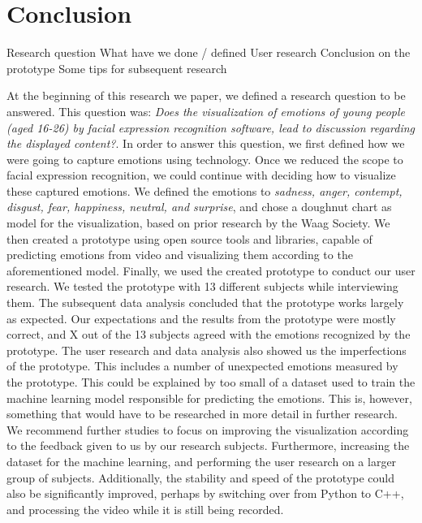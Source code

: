 \documentclass[sigconf]{acmart}
\begin{document}

\section{Conclusion}
Research question
What have we done / defined
User research
Conclusion on the prototype
Some tips for subsequent research

At the beginning of this research we paper, we defined a research question to be answered. This question was:
\emph{Does the visualization of emotions of young people (aged 16-26) by facial expression recognition software,
lead to discussion regarding the displayed content?}. In order to answer this question, we first defined how
we were going to capture emotions using technology. Once we reduced the scope to facial expression recognition,
we could continue with deciding how to visualize these captured emotions. We defined the emotions to
\emph{sadness, anger, contempt, disgust, fear, happiness, neutral, and surprise}, and chose a doughnut chart
as model for the visualization, based on prior research by the Waag Society. We then created a prototype
using open source tools and libraries, capable of predicting emotions from video and visualizing them according
to the aforementioned model.
Finally, we used the created prototype to conduct our user research. We tested the prototype with 13 different
subjects while interviewing them. The subsequent data analysis concluded that the prototype works largely as
expected. Our expectations and the results from the prototype were mostly correct, and X out of the 13 subjects
agreed with the emotions recognized by the prototype. The user research and data analysis also showed us the
imperfections of the prototype. This includes a number of unexpected emotions measured by the prototype.
This could be explained by too small of a dataset used to train the machine learning model responsible for
predicting the emotions. This is, however, something that would have to be researched in more detail in further
research. 
We recommend further studies to focus on improving the visualization according to the feedback given to us by
our research subjects. Furthermore, increasing the dataset for the machine learning, and performing the user
research on a larger group of subjects. Additionally, the stability and speed of the prototype could also be
significantly improved, perhaps by switching over from Python to C++, and processing the video while it is still
being recorded.
\end{document}
